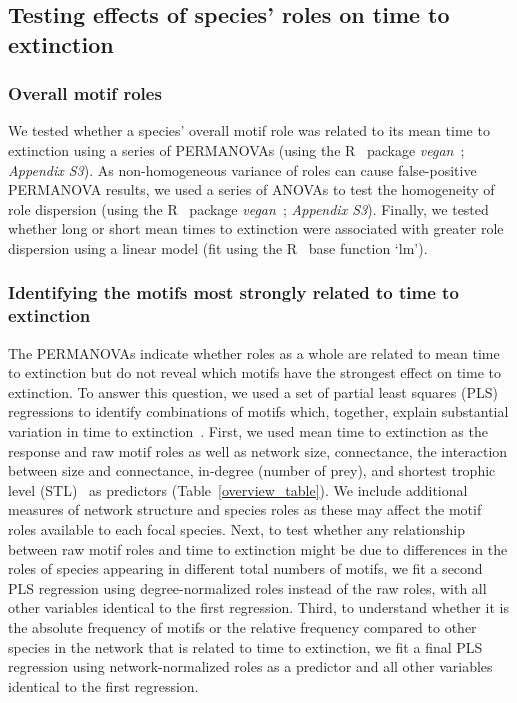\documentclass[12pt]{article}
\begin{document}
\begin{spacing}{2.0}
	\subsection*{Testing effects of species' roles on time to extinction}

		\subsubsection*{Overall motif roles}

            We tested whether a species' overall motif role was related to its mean time to extinction using a series of PERMANOVAs (using the R~\citep{R} package \emph{vegan}~\citep{vegan}; \emph{Appendix S3}).
            As non-homogeneous variance of roles can cause false-positive PERMANOVA results, we used a series of ANOVAs to test the homogeneity of role dispersion (using the R~\citep{R} package \emph{vegan}~\citep{vegan}; \emph{Appendix S3}).
            Finally, we tested whether long or short mean times to extinction were associated with greater role dispersion using a linear model (fit using the R~\citep{R} base function `lm').


		\subsubsection*{Identifying the motifs most strongly related to time to extinction}

			The PERMANOVAs indicate whether roles as a whole are related to mean time to extinction but do not reveal which motifs have the strongest effect on time to extinction.
			To answer this question, we used a set of partial least squares (PLS) regressions to identify combinations of motifs which, together, explain substantial variation in time to extinction~\citep{Mevik2004,pls}.
			First, we used mean time to extinction as the response and raw motif roles as well as network size, connectance, the interaction between size and connectance, in-degree (number of prey), and shortest trophic level (STL)~\citep{Hairston1993} as predictors (Table~\ref{overview_table}).
			We include additional measures of network structure and species roles as these may affect the motif roles available to each focal species.
			Next, to test whether any relationship between raw motif roles and time to extinction might be due to differences in the roles of species appearing in different total numbers of motifs, we fit a second PLS regression using degree-normalized roles instead of the raw roles, with all other variables identical to the first regression.
			Third, to understand whether it is the absolute frequency of motifs or the relative frequency compared to other species in the network that is related to time to extinction, we fit a final PLS regression using network-normalized roles as a predictor and all other variables identical to the first regression.
			

\end{spacing}
\end{document}
